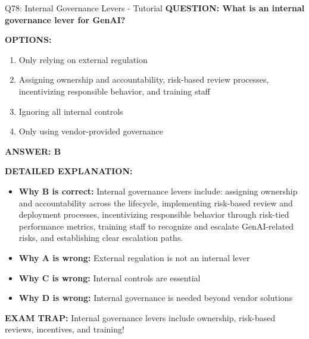 \documentclass[8pt]{beamer}
\begin{document}
	\begin{frame}{Q78: Internal Governance Levers - Tutorial}
		\fontsize{6.5}{7.5}\selectfont
		\textbf{QUESTION: What is an internal governance lever for GenAI?}
		
		\vspace{0.1cm}
		\textbf{OPTIONS:}
		\begin{enumerate}
			\item Only relying on external regulation
			\item Assigning ownership and accountability, risk-based review processes, incentivizing responsible behavior, and training staff
			\item Ignoring all internal controls
			\item Only using vendor-provided governance
		\end{enumerate}
		
		\vspace{0.1cm}
		\textcolor{myblue}{\textbf{ANSWER: B}}
		
		\vspace{0.1cm}
		\textbf{DETAILED EXPLANATION:}
		\begin{itemize}
			\item \textbf{Why B is correct:} Internal governance levers include: assigning ownership and accountability across the lifecycle, implementing risk-based review and deployment processes, incentivizing responsible behavior through risk-tied performance metrics, training staff to recognize and escalate GenAI-related risks, and establishing clear escalation paths.
			\item \textbf{Why A is wrong:} External regulation is not an internal lever
			\item \textbf{Why C is wrong:} Internal controls are essential
			\item \textbf{Why D is wrong:} Internal governance is needed beyond vendor solutions
		\end{itemize}
		
		\textcolor{myred}{\textbf{EXAM TRAP:}} Internal governance levers include \textcolor{myblue}{ownership, risk-based reviews, incentives, and training}!
	\end{frame}
	
\end{document}
